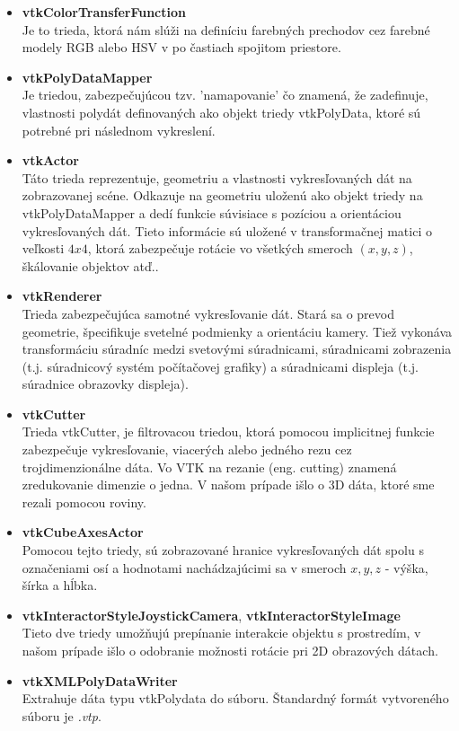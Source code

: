 \documentclass[a4paper,11pt,twoside]{article}%
\begin{document}
\begin{itemize}
\item \textbf{vtkColorTransferFunction} \\
Je to trieda, ktorá nám slúži na definíciu farebných prechodov cez farebné modely RGB alebo HSV v po častiach spojitom priestore. 

\item \textbf{vtkPolyDataMapper} \\
Je triedou, zabezpečujúcou tzv. 'namapovanie' čo znamená, že zadefinuje, vlastnosti polydát definovaných ako objekt triedy vtkPolyData, ktoré sú potrebné pri následnom vykreslení.

\item \textbf{vtkActor} \\
Táto trieda reprezentuje, geometriu a vlastnosti vykresľovaných dát na zobrazovanej scéne. Odkazuje na geometriu uloženú ako objekt triedy na vtkPolyDataMapper a dedí funkcie súvisiace s pozíciou a orientáciou vykresľovaných dát. Tieto informácie sú uložené v transformačnej matici o veľkosti $4x4$, ktorá zabezpečuje rotácie vo všetkých smeroch $(x, y, z)$, škálovanie objektov atď..

\item \textbf{vtkRenderer} \\
Trieda zabezpečujúca samotné vykresľovanie dát. Stará sa o prevod geometrie, špecifikuje svetelné podmienky a orientáciu kamery. Tiež vykonáva transformáciu súradníc medzi svetovými súradnicami, súradnicami zobrazenia (t.j. súradnicový systém počítačovej grafiky) a súradnicami displeja (t.j.  súradnice obrazovky displeja).

\item \textbf{vtkCutter} \\
Trieda vtkCutter, je filtrovacou triedou, ktorá pomocou implicitnej funkcie zabezpečuje vykresľovanie, viacerých alebo jedného rezu cez trojdimenzionálne dáta. Vo VTK na rezanie (eng. cutting) znamená zredukovanie dimenzie o jedna. V našom prípade išlo o 3D dáta, ktoré sme rezali pomocou roviny. 

\item \textbf{vtkCubeAxesActor} \\
Pomocou tejto triedy, sú zobrazované hranice vykresľovaných dát spolu s označeniami osí a  hodnotami nachádzajúcimi sa v smeroch $x, y, z$ - výška, šírka a hĺbka.

\item \textbf{vtkInteractorStyleJoystickCamera}, \textbf{vtkInteractorStyleImage}  \\
Tieto dve triedy umožňujú prepínanie interakcie objektu s prostredím, v našom prípade išlo o odobranie možnosti rotácie pri 2D obrazových dátach.

\item \textbf{vtkXMLPolyDataWriter} \\
Extrahuje dáta typu vtkPolydata do súboru. Štandardný formát vytvoreného súboru je \textit{.vtp}. 
\end{itemize}
\end{document}
